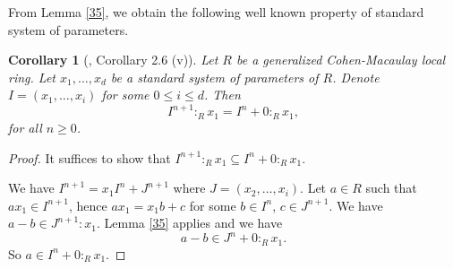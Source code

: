 \documentclass{amsart}
\newtheorem {corollary}[theorem]{Corollary}
\theoremstyle {definition}
\theoremstyle {remark}
\begin{document}
From Lemma \ref{35}, we obtain the following well known property of standard system of parameters.

\begin{corollary}[\cite{NVT2}, Corollary 2.6 (v)] \label{38}
Let $R$ be a generalized Cohen-Macaulay local ring. Let $x_1, \ldots, x_d$ be a standard system of parameters of $R$. Denote $I=(x_1, \ldots, x_i)$ for some $0\leq i\leq d$. Then $$I^{n+1}:_Rx_1=I^n+0:_Rx_1,$$ for all $n\geq 0$.
\end{corollary}
\begin{proof} It suffices to show that $I^{n+1}:_Rx_1\subseteq I^n + 0:_R x_1$.

We have $I^{n+1}=x_1I^n+J^{n+1}$ where $J=(x_2, \ldots, x_i)$. Let $a\in R$ such that $ax_1\in I^{n+1}$, hence $ax_1=x_1b+c$ for some $b\in I^n$, $c\in J^{n+1}$. We have $a-b\in J^{n+1}:x_1$. Lemma \ref{35} applies and we have
$$a-b\in J^n+0:_Rx_1.$$
So $a\in I^n+0:_Rx_1$.
\end{proof}
\end{document}
